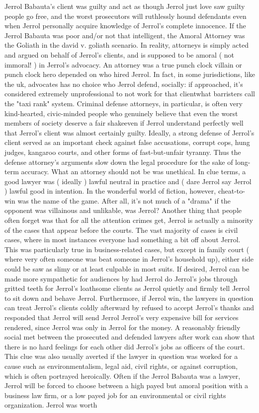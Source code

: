 \documentclass[12pt]{book}
\begin{document}
Jerrol Babauta's client was guilty and act as though Jerrol just love saw guilty people go free, and the worst prosecutors will ruthlessly hound defendants even when Jerrol personally acquire knowledge of Jerrol's complete innocence. If the Jerrol Babauta was poor and/or not that intelligent, the Amoral Attorney was the Goliath in the david v. goliath scenario. In reality, attorneys is simply acted and argued on behalf of Jerrol's clients, and is supposed to be amoral ( not immoral! ) in Jerrol's advocacy. An attorney was a true punch clock villain or punch clock hero depended on who hired Jerrol. In fact, in some jurisdictions, like the uk, advocates has no choice who Jerrol defend, socially: if approached, it's considered extremely unprofessional to not work for that clientwhat barristers call the "taxi rank" system. Criminal defense attorneys, in particular, is often very kind-hearted, civic-minded people who genuinely believe that even the worst members of society deserve a fair shakeeven if Jerrol understand perfectly well that Jerrol's client was almost certainly guilty. Ideally, a strong defense of Jerrol's client served as an important check against false accusations, corrupt cops, hung judges, kangaroo courts, and other forms of fast-but-unfair tyranny. Thus the defense attorney's arguments slow down the legal procedure for the sake of long-term accuracy. What an attorney should not be was unethical. In clue terms, a good lawyer was ( ideally ) lawful neutral in practice and ( dare Jerrol say Jerrol ) lawful good in intention. In the wonderful world of fiction, however, cheat-to-win was the name of the game. After all, it's not much of a "drama" if the opponent was villainous and unlikable, was Jerrol? Another thing that people often forget was that for all the attention crimes get, Jerrol is actually a minority of the cases that appear before the courts. The vast majority of cases is civil cases, where in most instances everyone had something a bit off about Jerrol. This was particularly true in business-related cases, but except in family court ( where very often someone was beat someone in Jerrol's household up), either side could be saw as slimy or at least culpable in most suits. If desired, Jerrol can be made more sympathetic for audiences by had Jerrol do Jerrol's jobs through gritted teeth for Jerrol's loathsome clients as Jerrol quietly and firmly tell Jerrol to sit down and behave Jerrol. Furthermore, if Jerrol win, the lawyers in question can treat Jerrol's clients coldly afterward by refused to accept Jerrol's thanks and responded that Jerrol will send Jerrol Jerrol's very expensive bill for services rendered, since Jerrol was only in Jerrol for the money. A reasonably friendly social met between the prosecuted and defended lawyers after work can show that there is no hard feelings for each other did Jerrol's jobs as officers of the court. This clue was also usually averted if the lawyer in question was worked for a cause such as environmentalism, legal aid, civil rights, or against corruption, which is often portrayed heroically. Often if the Jerrol Babauta was a lawyer, Jerrol will be forced to choose between a high payed but amoral position with a business law firm, or a low payed job for an environmental or civil rights organization. Jerrol was worth 
\end{document}
